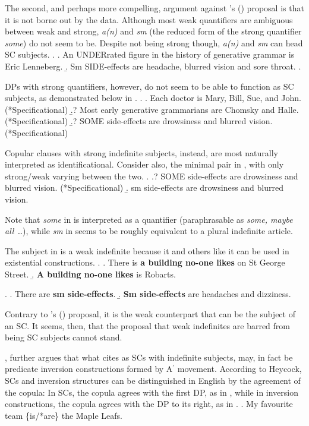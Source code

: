 \documentclass[
	letterpaper,
]{article}
\begin{document}
The second, and perhaps more compelling, argument against \citeauthor{heycock2012specification}'s (\citeyear{heycock2012specification}) proposal is that it is not borne out by the data.
Although most weak quantifiers are ambiguous between weak and strong, \textit{a(n)} and \textit{sm} (the reduced form of the strong quantifier \textit{some}) do not seem to be.
Despite not being strong though, \textit{a(n)} and \textit{sm} can head SC subjects.
\ex.
\a. An UNDERrated figure in the history of generative grammar is Eric Lenneberg.
\b. Sm SIDE-effects are headache, blurred vision and sore throat.
\z.

DPs with strong quantifiers, however, do not seem to be able to function as SC subjects, as demonstrated below in \Next.
\ex.
\a. Each doctor is Mary, Bill, Sue, and John. (*Specificational)
\b.? Most early generative grammarians are Chomsky and Halle. (*Specificational)
\b.? SOME side-effects are drowsiness and blurred vision. (*Specificational)

Copular clauses with strong indefinite subjects, instead, are most naturally interpreted as identificational.
Consider also, the minimal pair in \Next, with only strong/weak varying between the two.
\ex.
\a.? SOME side-effects are drowsiness and blurred vision. (*Specificational)
\b. sm side-effects are drowsiness and blurred vision.

Note that \textit{some} in \Last[a] is interpreted as a quantifier (paraphrasable as \textit{some, maybe all \dots}), while \textit{sm} in \Last[b] seems to be roughly equivalent to a plural indefinite article.

The subject in \Last[b] is a weak indefinite because it and others like it can be used in existential constructions.
\ex. 
\a. There is \textbf{a building no-one likes} on St George Street.
\b. \textbf{A building no-one likes} is Robarts.

\ex.
\a. There are \textbf{sm side-effects}.
\b. \textbf{Sm side-effects} are headaches and dizziness. 

Contrary to \citeauthor{heycock2012specification}'s (\citeyear{heycock2012specification}) proposal, it is the weak counterpart that can be the subject of an SC.
It seems, then, that the proposal that weak indefinites are barred from being SC subjects cannot stand.

\textcite{heycock2012specification}, further argues that what \textcite{mikkelsen2005copular} cites as SCs with indefinite subjects, may, in fact be predicate inversion constructions formed by A$^{\prime}$ movement.
According to Heycock, SCs and inversion structures can be distinguished in English by the agreement of the copula:
In SCs, the copula agrees with the first DP, as in \Next, while in inversion constructions, the copula agrees with the DP to its right, as in \NNext.
\ex. My favourite team \{is/*are\} the Maple Leafs.
\end{document}
